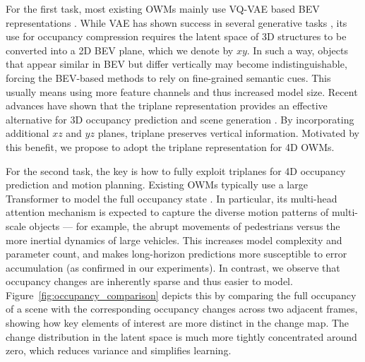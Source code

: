 \documentclass[11pt,a4paper]{article}
\begin{document}
For the first task, most existing OWMs \cite{julongwei2024,tianshuoxu2025,wenzhaozheng2024,ziyangyan2025} mainly use VQ-VAE based BEV representations \cite{aaronvandenoord2017}.
While VAE has shown success in several generative tasks \cite{yumingjiang2023,hangzhang2024}, its use for occupancy compression requires the latent space of 3D structures to be converted into a 2D BEV plane, which we denote by $xy$.
In such a way, objects that appear similar in BEV but differ vertically may become indistinguishable, forcing the BEV-based methods to rely on fine-grained semantic cues.
This usually means using more feature channels and thus increased model size.
Recent advances have shown that the triplane representation provides an effective alternative for 3D occupancy prediction and scene generation \cite{rajaeikhatibandrajagiryes2024,taohu2023,juminlee2024}.
By incorporating additional $xz$ and $yz$ planes, triplane preserves vertical information.
Motivated by this benefit, we propose to adopt the triplane representation for 4D OWMs.

For the second task, the key is how to fully exploit triplanes for 4D occupancy prediction and motion planning.
Existing OWMs typically use a large Transformer to model the full occupancy state \cite{tianshuoxu2025,julongwei2024}.
In particular, its multi-head attention mechanism is expected to capture the diverse motion patterns of multi-scale objects --- for example, the abrupt movements of pedestrians versus the more inertial dynamics of large vehicles.
This increases model complexity and parameter count, and makes long-horizon predictions more susceptible to error accumulation (as confirmed in our experiments).
In contrast, we observe that occupancy changes are inherently sparse and thus easier to model.
Figure~\ref{fig:occupancy_comparison} depicts this by comparing the full occupancy of a scene with the corresponding occupancy changes across two adjacent frames, showing how key elements of interest are more distinct in the change map.
The change distribution in the latent space is much more tightly concentrated around zero, which reduces variance and simplifies learning.
\end{document}
